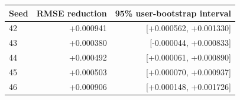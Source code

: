 \begin{tabular}{@{}lrr@{}}\toprule
Seed & RMSE reduction & 95\% user-bootstrap interval\\\midrule
42 & +0.000941 & [+0.000562, +0.001330]\\
43 & +0.000380 & [-0.000044, +0.000833]\\
44 & +0.000492 & [+0.000061, +0.000890]\\
45 & +0.000503 & [+0.000070, +0.000937]\\
46 & +0.000906 & [+0.000148, +0.001726]\\
\bottomrule\end{tabular}

